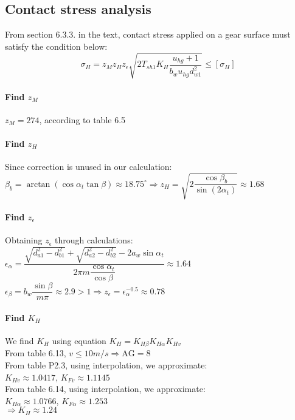 \subsection{Contact stress analysis}
From section 6.3.3. in the text, contact stress applied on a gear surface must satisfy the condition below:
\begin{equation}
	\sigma_H = z_Mz_Hz_\epsilon\sqrt{2T_{sh1}K_H\dfrac{u_{hg}+1}{b_wu_{hg}d_{w1}^2}} \leq [\sigma_H]
\end{equation}

\paragraph{Find $ z_M $}
$ z_M = 274 $, according to table 6.5 
\paragraph{Find $ z_H $}
Since correction is unused in our calculation:\\
$ \beta_b = \arctan\left( \cos\alpha_t\tan\beta\right) \approx 18.75^\circ \Rightarrow z_H = \sqrt{2\dfrac{\cos\beta_b}{\sin(2\alpha_t)}} \approx 1.68$
\paragraph{Find $ z_\epsilon $} Obtaining $ z_\epsilon $ through calculations:\\
$ \epsilon_\alpha = \dfrac{\sqrt{d_{a1}^2-d_{b1}^2}+\sqrt{d_{a2}^2-d_{b2}^2}-2a_w\sin\alpha_{t}}{2\pi m\dfrac{\cos\alpha_t}{\cos\beta}} \approx 1.64$\\
$ \epsilon_\beta = b_w\dfrac{\sin\beta}{m\pi} \approx 2.9>1 \Rightarrow z_\epsilon = \epsilon_\alpha^{-0.5} \approx 0.78$
\paragraph{Find $ K_H $} We find $ K_H $ using equation $ K_H = K_{H\beta}K_{H\alpha}K_{Hv} $\\
From table 6.13, $ v\leq10\unit{m/s}\Rightarrow \text{AG} = 8 $ \\
From table P2.3, using interpolation, we approximate:\\ $ K_{Hv} \approx1.0417$, $ K_{Fv} \approx1.1145$\\
From table 6.14, using interpolation, we approximate:\\ $ K_{H\alpha} \approx1.0766$, $ K_{F\alpha} \approx1.253 $ \\	
$ \Rightarrow K_H \approx 1.24 $
